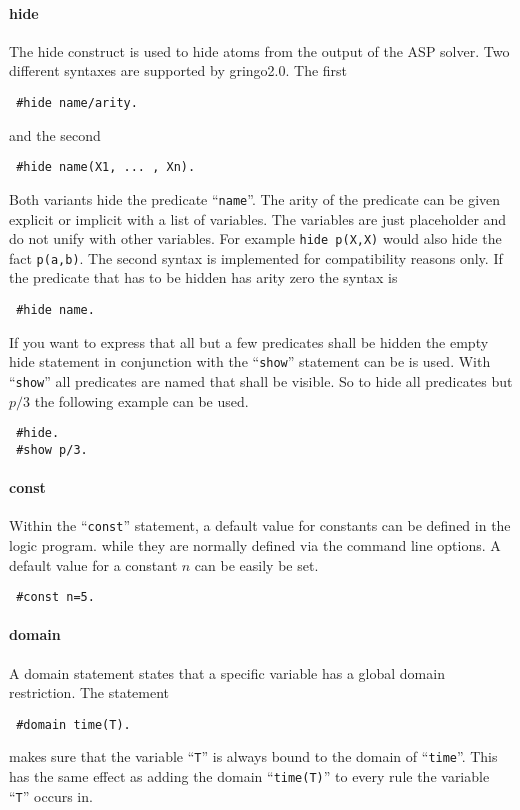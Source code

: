 \documentclass[a4paper,10pt]{article}
\begin{document}
\paragraph{hide}
The hide construct is used to hide atoms from the output of the ASP solver.
Two different syntaxes are supported by gringo2.0.
The first 
\begin{verbatim}
 #hide name/arity.
\end{verbatim}
and the second
\begin{verbatim}
 #hide name(X1, ... , Xn).
\end{verbatim}
Both variants hide the predicate ``\texttt{name}''.
The arity of the predicate can be given explicit or implicit with a list of variables.
The variables are just placeholder and do not unify with other variables. For example \texttt{hide p(X,X)} would also hide the fact \texttt{p(a,b)}. The second syntax is implemented for compatibility reasons only.
If the predicate that has to be hidden has arity zero the syntax is
\begin{verbatim}
 #hide name.
\end{verbatim}
If you want to express that all but a few predicates shall be hidden the empty hide statement
in conjunction with the ``\texttt{show}'' statement can be is used.
With ``\texttt{show}'' all predicates are named that shall be visible.
So to hide all predicates but $p/3$ the following example can be used.
\begin{verbatim}
 #hide.
 #show p/3.
\end{verbatim}

\paragraph{const}
Within the ``\texttt{const}'' statement, a default value for constants can be defined in the logic program.
while they are normally defined via the command line options.
A default value for a constant $n$ can be easily be set.
\begin{verbatim}
 #const n=5.
\end{verbatim}
\paragraph{domain}
A domain statement states that a specific variable has a global domain restriction.
The statement
\begin{verbatim}
 #domain time(T).
\end{verbatim}
makes sure that the variable ``\texttt{T}'' is always bound to the domain of ``\texttt{time}''.
This has the same effect as adding the domain ``\texttt{time(T)}'' to every rule the variable ``\texttt{T}'' occurs in.
\end{document}
